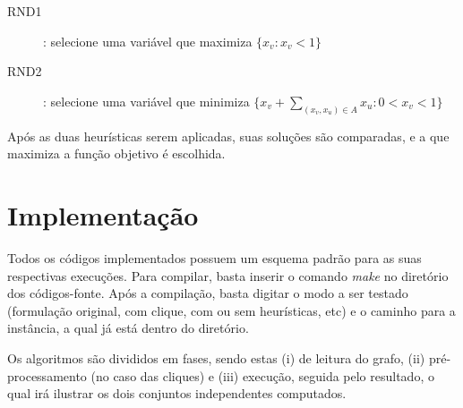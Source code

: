 \documentclass[12pt]{article}
\begin{document}
\begin{description}
\item[RND1]: selecione uma variável que maximiza $\{x_v : x_v < 1\}$
\item[RND2]: selecione uma variável que minimiza $\{x_v + \sum\limits_{(x_v, x_u) \in A}x_u : 0 < x_v < 1\}$
\end{description}

Após as duas heurísticas serem aplicadas, suas soluções são comparadas, e a que maximiza a função objetivo é escolhida.

\section{Implementação}

Todos os códigos implementados possuem um esquema padrão para as suas respectivas execuções. Para compilar, basta inserir o comando \textsl{make} no diretório dos códigos-fonte. Após a compilação, basta digitar o modo a ser testado (formulação original, com clique, com ou sem heurísticas, etc) e o caminho para a instância, a qual já está dentro do diretório.

Os algoritmos são divididos em fases, sendo estas (i) de leitura do grafo, (ii) pré-processamento (no caso das cliques) e (iii) execução, seguida pelo resultado, o qual irá ilustrar os dois conjuntos independentes computados.
\end{document}
